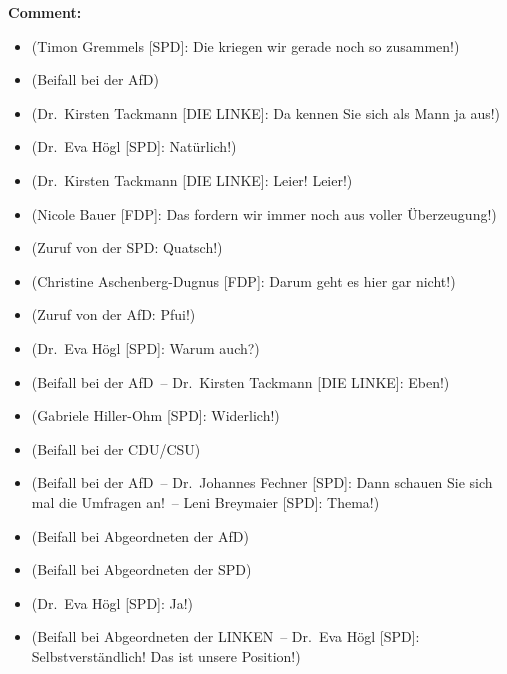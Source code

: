 \documentclass{article}
\begin{document}
\noindent\textbf{Comment:}
\begin{itemize}
    \setlength\itemsep{-3pt}
    \item (Timon Gremmels [SPD]: Die kriegen wir gerade noch so zusammen!)
    \setlength\itemsep{-3pt}
    \item (Beifall bei der AfD)
    \setlength\itemsep{-3pt}
    \item (Dr. Kirsten Tackmann [DIE LINKE]: Da kennen Sie sich als Mann ja aus!)
    \setlength\itemsep{-3pt}
    \item (Dr. Eva Högl [SPD]: Natürlich!)
    \setlength\itemsep{-3pt}
    \item (Dr. Kirsten Tackmann [DIE LINKE]: Leier! Leier!)
    \setlength\itemsep{-3pt}
    \item (Nicole Bauer [FDP]: Das fordern wir immer noch aus voller Überzeugung!)
    \setlength\itemsep{-3pt}
    \item (Zuruf von der SPD: Quatsch!)
    \setlength\itemsep{-3pt}
    \item (Christine Aschenberg-Dugnus [FDP]: Darum geht es hier gar nicht!)
    \setlength\itemsep{-3pt}
    \item (Zuruf von der AfD: Pfui!)
    \setlength\itemsep{-3pt}
    \item (Dr. Eva Högl [SPD]: Warum auch?)
    \setlength\itemsep{-3pt}
    \item (Beifall bei der AfD – Dr. Kirsten Tackmann [DIE LINKE]: Eben!)
    \setlength\itemsep{-3pt}
    \item (Gabriele Hiller-Ohm [SPD]: Widerlich!)
    \setlength\itemsep{-3pt}
    \item (Beifall bei der CDU/CSU)
    \setlength\itemsep{-3pt}
    \item (Beifall bei der AfD – Dr. Johannes Fechner [SPD]: Dann schauen Sie sich mal die Umfragen an! – Leni Breymaier [SPD]: Thema!)
    \setlength\itemsep{-3pt}
    \item (Beifall bei Abgeordneten der AfD)
    \setlength\itemsep{-3pt}
    \item (Beifall bei Abgeordneten der SPD)
    \setlength\itemsep{-3pt}
    \item (Dr. Eva Högl [SPD]: Ja!)
    \setlength\itemsep{-3pt}
    \item (Beifall bei Abgeordneten der LINKEN – Dr. Eva Högl [SPD]: Selbstverständlich! Das ist unsere Position!)
\end{itemize}
\end{document}
